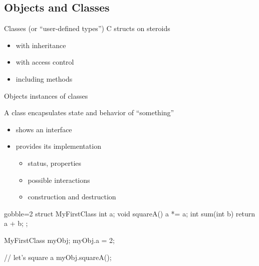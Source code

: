 \subsection[OO]{Objects and Classes}

\begin{frame}[fragile]
  \begin{block}{Classes (or ``user-defined types'')}
    C structs on steroids
    \begin{itemize}
    \item with inheritance
    \item with access control
    \item including methods
    \end{itemize}
  \end{block}
  \begin{block}{Objects}
    instances of classes
  \end{block}
  \begin{block}{A class encapsulates state and behavior of ``something''}
    \begin{itemize}
    \item shows an interface
    \item provides its implementation
      \begin{itemize}
      \item status, properties
      \item possible interactions
      \item construction and destruction
      \end{itemize}
    \end{itemize}
  \end{block}
\end{frame}


\begin{frame}[fragile]
  \begin{multicols}{2}
    \begin{cppcode*}{gobble=2}
      struct MyFirstClass {
        int a;
        void squareA() {
          a *= a;
        }
        int sum(int b) {
          return a + b;
        }
      };

      MyFirstClass myObj;
      myObj.a = 2;

      // let's square a
      myObj.squareA();
    \end{cppcode*}
    \columnbreak
    \center
    \null \vfill
    \vfill \null
  \end{multicols}
\end{frame}

